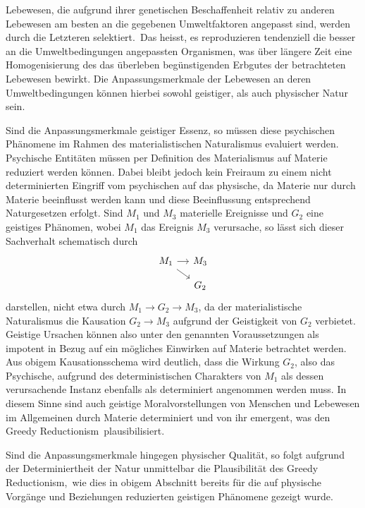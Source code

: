 \documentclass[a4paper,11pt]{article}
\numberwithin{equation}{section}
\begin{document}
Lebewesen, die aufgrund ihrer genetischen Beschaffenheit relativ zu anderen Lebewesen am besten an die gegebenen Umweltfaktoren angepasst sind, werden durch die Letzteren \flqq selektiert\frqq.\ Das heisst, es reproduzieren tendenziell die besser an die Umweltbedingungen angepassten Organismen, was über längere Zeit eine Homogenisierung des das überleben begünstigenden Erbgutes der betrachteten Lebewesen bewirkt. Die Anpassungsmerkmale der Lebewesen an deren Umweltbedingungen können hierbei sowohl geistiger, als auch physischer Natur sein. 

Sind die Anpassungsmerkmale geistiger Essenz, so müssen diese psychischen Phänomene im Rahmen des materialistischen Naturalismus evaluiert werden. Psychische Entitäten müssen per Definition des Materialismus auf Materie reduziert werden können. Dabei bleibt jedoch kein Freiraum zu einem nicht determinierten Eingriff vom psychischen auf das physische, da Materie nur durch Materie beeinflusst werden kann und diese Beeinflussung entsprechend Naturgesetzen erfolgt. Sind $M_1$ und $M_3$ materielle Ereignisse und $G_2$ eine geistiges Phänomen, wobei $M_1$ das Ereignis $M_3$ verursache, so lässt sich dieser Sachverhalt schematisch durch $$\begin{tikzcd}[sep=small]
M_1 \arrow[rd] \arrow[r] & M_3 \\
& G_2
\end{tikzcd}$$ darstellen, nicht etwa durch $M_1 \rightarrow G_2 \rightarrow M_3$, da der materialistische Naturalismus die Kausation $G_2 \rightarrow M_3$ aufgrund der Geistigkeit von $G_2$ verbietet. Geistige Ursachen können also unter den genannten Voraussetzungen als impotent in Bezug auf ein mögliches Einwirken auf Materie betrachtet werden. Aus obigem Kausationsschema wird deutlich, dass die Wirkung $G_2$, also das Psychische, aufgrund des deterministischen Charakters von $M_1$ als dessen verursachende Instanz ebenfalls als determiniert angenommen werden muss. In diesem Sinne sind auch geistige Moralvorstellungen von Menschen und Lebewesen im Allgemeinen durch Materie determiniert und von ihr emergent, was den \flqq Greedy Reductionism\frqq\ plausibilisiert.

Sind die Anpassungsmerkmale hingegen physischer Qualität, so folgt aufgrund der Determiniertheit der Natur unmittelbar die Plausibilität des \flqq Greedy Reductionism\frqq,\ wie dies in obigem Abschnitt bereits für die auf physische Vorgänge und Beziehungen reduzierten geistigen Phänomene gezeigt wurde.
\end{document}
